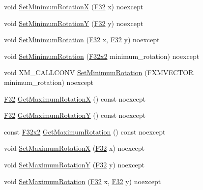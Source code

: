 \begin{DoxyCompactItemize}
\item 
void \hyperlink{classmage_1_1script_1_1_mouse_look_script_a07c261e34b3131114efacb0d0f6ae076}{Set\+Minimum\+RotationX} (\hyperlink{namespacemage_aa97e833b45f06d60a0a9c4fc22ae02c0}{F32} x) noexcept
\item 
void \hyperlink{classmage_1_1script_1_1_mouse_look_script_ab78678ccb7bdf6ac4093b7911bf81d54}{Set\+Minimum\+RotationY} (\hyperlink{namespacemage_aa97e833b45f06d60a0a9c4fc22ae02c0}{F32} y) noexcept
\item 
void \hyperlink{classmage_1_1script_1_1_mouse_look_script_a6964af9c1c264be02c37671019ab117f}{Set\+Minimum\+Rotation} (\hyperlink{namespacemage_aa97e833b45f06d60a0a9c4fc22ae02c0}{F32} x, \hyperlink{namespacemage_aa97e833b45f06d60a0a9c4fc22ae02c0}{F32} y) noexcept
\item 
void \hyperlink{classmage_1_1script_1_1_mouse_look_script_ab901aa0a3d22ef1e28f00db6f4f99aa1}{Set\+Minimum\+Rotation} (\hyperlink{namespacemage_aa87237ad091f5cd7da612b8523fc108f}{F32x2} minimum\+\_\+rotation) noexcept
\item 
void X\+M\+\_\+\+C\+A\+L\+L\+C\+O\+NV \hyperlink{classmage_1_1script_1_1_mouse_look_script_ab120a7b0d01acb64ae4287d716d89a09}{Set\+Minimum\+Rotation} (F\+X\+M\+V\+E\+C\+T\+OR minimum\+\_\+rotation) noexcept
\item 
\hyperlink{namespacemage_aa97e833b45f06d60a0a9c4fc22ae02c0}{F32} \hyperlink{classmage_1_1script_1_1_mouse_look_script_a5d0e63ee050bf07f5c8ad75ca9ced307}{Get\+Maximum\+RotationX} () const noexcept
\item 
\hyperlink{namespacemage_aa97e833b45f06d60a0a9c4fc22ae02c0}{F32} \hyperlink{classmage_1_1script_1_1_mouse_look_script_a24f48ac9e66f9c14645db71fd55ab9c6}{Get\+Maximum\+RotationY} () const noexcept
\item 
const \hyperlink{namespacemage_aa87237ad091f5cd7da612b8523fc108f}{F32x2} \hyperlink{classmage_1_1script_1_1_mouse_look_script_a2ceb928a903baf5b30ea99e321af671c}{Get\+Maximum\+Rotation} () const noexcept
\item 
void \hyperlink{classmage_1_1script_1_1_mouse_look_script_a538d1d81ac4220a0e20e3e5de5c8e3a6}{Set\+Maximum\+RotationX} (\hyperlink{namespacemage_aa97e833b45f06d60a0a9c4fc22ae02c0}{F32} x) noexcept
\item 
void \hyperlink{classmage_1_1script_1_1_mouse_look_script_af56c4be26dde7497d53bb9f48d1b1a55}{Set\+Maximum\+RotationY} (\hyperlink{namespacemage_aa97e833b45f06d60a0a9c4fc22ae02c0}{F32} y) noexcept
\item 
void \hyperlink{classmage_1_1script_1_1_mouse_look_script_a50c3ddaad18713509394d168cddc8aa8}{Set\+Maximum\+Rotation} (\hyperlink{namespacemage_aa97e833b45f06d60a0a9c4fc22ae02c0}{F32} x, \hyperlink{namespacemage_aa97e833b45f06d60a0a9c4fc22ae02c0}{F32} y) noexcept

\end{DoxyCompactItemize}
